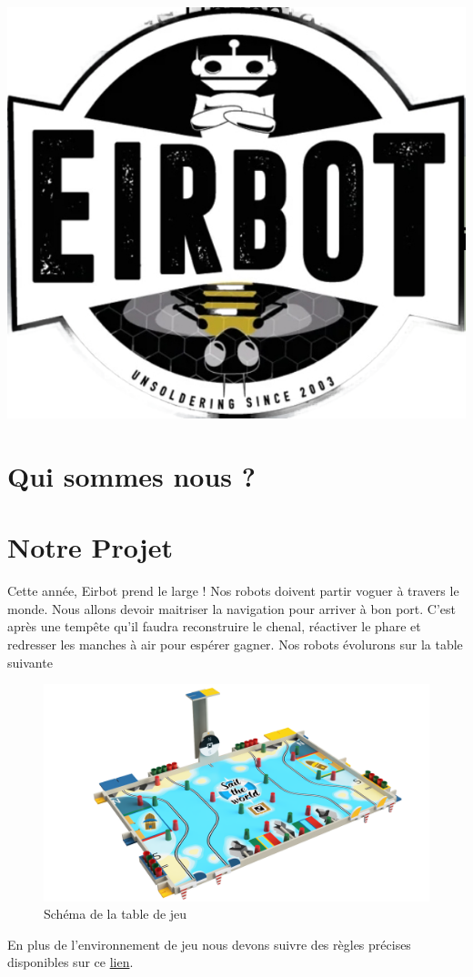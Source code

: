 \documentclass[a4paper,10pt]{article}
\begin{document}
\begin{spacing}{1.5}
{  \includegraphics[scale=0.075]{65508.png} }
\section{Qui sommes nous ?}

\newpage
\section{Notre Projet}
Cette année, Eirbot prend le large ! Nos robots doivent partir voguer à travers
le monde. Nous allons devoir maitriser la navigation pour arriver à bon port.
C'est après une tempête qu'il faudra reconstruire le chenal, réactiver le phare
et redresser les manches à air pour espérer gagner. Nos robots évolurons sur la
table suivante
\begin{figure}[H]
  \center
  \includegraphics[scale=0.2]{table.png}
  \caption{Schéma de la table de jeu}
\end{figure}
En plus de l'environnement de jeu nous devons suivre des règles précises
disponibles sur ce \href{https://www.coupederobotique.fr/wp-content/uploads/Eurobot2020_Rules_Cup_OFFICIAL_FR.pdf}{lien}.

\end{spacing}
\end{document}
